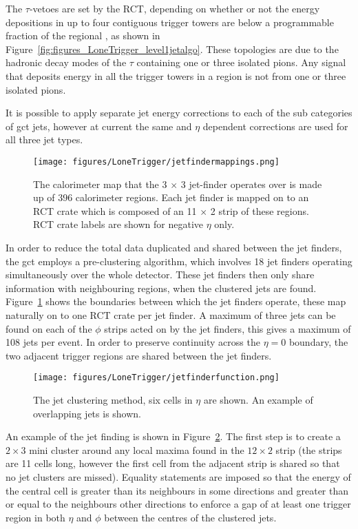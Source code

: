 The $\tau$-vetoes are set by the RCT, depending on whether or not the energy 
depositions in up to four contiguous trigger towers are below a programmable 
fraction of the regional \ET, as shown in 
Figure~\ref{fig:figures_LoneTrigger_level1jetalgo}. These topologies are due to 
the hadronic decay modes of the $\tau$ containing one or three isolated pions. 
Any signal that deposits energy in all the trigger towers in a region is not 
from one or three isolated pions.

It is possible to apply separate jet energy corrections to each of the sub 
categories of \ac{gct} jets, however at current the same \ET and $\eta$ dependent 
corrections are used for all three jet types.

\begin{figure}[ht]
  \centering    
  \texttt{[image: figures/LoneTrigger/jetfindermappings.png]}
  \caption{The calorimeter map that the 3 $\times$ 3 jet-finder operates over
   is made up of 396 calorimeter regions. Each jet finder is mapped on to an 
   RCT crate which is composed of an 11 $\times$ 2 strip of these regions. RCT
   crate labels are shown for negative $\eta$ only. }
  \label{fig:figures_LoneTrigger_jetfindermappings}
\end{figure}

In order to reduce the total data duplicated and shared between the jet finders,
the \ac{gct} employs a pre-clustering algorithm, which involves 18 jet finders 
operating simultaneously over the whole detector. These jet finders then only
share information with neighbouring regions, when the clustered jets are found.
Figure~\ref{fig:figures_LoneTrigger_jetfindermappings} shows the boundaries 
between which the jet finders operate, these map naturally on to one RCT crate 
per jet finder. A maximum of three jets can be found on each of the $\phi$ 
strips acted on by the jet finders, this gives a maximum of 108 jets per event. 
In order to preserve continuity across the $\eta = 0$ boundary, the two adjacent
trigger regions are shared between the jet finders.


\begin{figure}[ht]
  \centering
 \texttt{[image: figures/LoneTrigger/jetfinderfunction.png]}
  \caption{The \Lone jet clustering method, six cells in $\eta$ are shown. An
  example of overlapping jets is shown.}
  \label{fig:figures_LoneTrigger_jetfinderfunction}
\end{figure}


An example of the jet finding is shown in
Figure~\ref{fig:figures_LoneTrigger_jetfinderfunction}. The first step is to 
create a $2 \times 3$ mini cluster around any local maxima found in the $12 
\times 2$ strip (the strips are 11 cells long, however the first cell from the adjacent strip is shared so that no jet clusters are missed). Equality statements are imposed so that the energy of the 
central cell is greater than its neighbours in some directions and greater than 
or equal to the neighbours other directions to enforce a gap of at least one 
trigger region in both $\eta$ and $\phi$ between the centres of the clustered 
jets.

